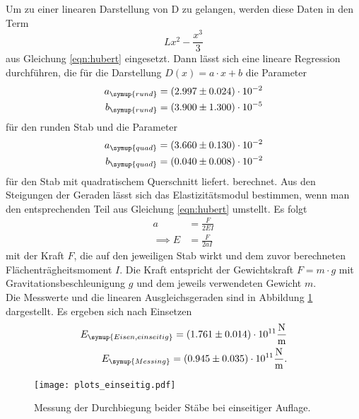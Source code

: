   \noindent Um zu einer linearen Darstellung von D zu gelangen, werden diese Daten in den Term
  \begin{equation*}
    L x^2 - \frac{x^3}{3}
  \end{equation*}
  aus Gleichung \eqref{eqn:hubert} eingesetzt. Dann lässt sich eine lineare Regression durchführen, die 
  für die Darstellung $D(x) = a \cdot x + b$ die Parameter
  \begin{align*}
    a_{\symup{rund}} = \left(2.997 \pm 0.024 \right) \cdot 10^{-2}\\
    b_{\symup{rund}} = \left(3.900 \pm 1.300 \right) \cdot 10^{-5}\\
  \end{align*}
  für den runden Stab und die Parameter
  \begin{align*}
    a_{\symup{quad}} = \left( 3.660 \pm 0.130 \right) \cdot 10^{-2}\\
    b_{\symup{quad}} = \left(0.040 \pm 0.008 \right) \cdot 10^{-2}\\
  \end{align*}
  für den Stab mit quadratischem Querschnitt liefert.
  berechnet. Aus den Steigungen der Geraden lässt sich das Elastizitätsmodul bestimmen, wenn man den 
  entsprechenden Teil aus Gleichung \eqref{eqn:hubert} umstellt. Es folgt
  \begin{align*}
    a &= \frac{F}{2 E I}\\
    \implies E &= \frac{F}{2 a I}
  \end{align*}
  mit der Kraft $F$, die auf den jeweiligen Stab wirkt und dem zuvor berechneten Flächenträgheitsmoment $I$.
  Die Kraft entspricht der Gewichtskraft $F = m \cdot g$ mit Gravitationsbeschleunigung $g$
  und dem jeweils verwendeten Gewicht $m$. \\
  Die Messwerte und die linearen Ausgleichsgeraden sind in Abbildung \ref{fig:plots} dargestellt.
  Es ergeben sich nach Einsetzen
  \begin{align*}
    E_{\symup{Eisen, einseitig}} = \left( 1.761 \pm 0.014\right)\cdot 10^{11} \si{\newton\per\m}\\
    E_{\symup{Messing}} = \left( 0.945 \pm 0.035 \right)\cdot 10^{11} \si{\newton\per\m}.\\ %
  \end{align*}

  \begin{figure}
    \centering
    \texttt{[image: plots\_einseitig.pdf]}
    \caption{Messung der Durchbiegung beider Stäbe bei einseitiger Auflage.}
    \label{fig:plots}
  \end{figure}
  

